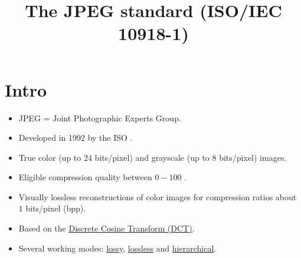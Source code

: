 \title{The JPEG standard (ISO/IEC 10918-1)}
\maketitle
\tableofcontents

\section{Intro}
\begin{itemize}
\item JPEG = Joint Photographic Experts Group.
\item Developed in 1992 by the ISO \cite{CCITT.T81}.
\item True color (up to 24 bits/pixel) and grayscale (up to 8
  bits/pixel) images.
\item Eligible compression quality between $0-100$ \cite{Wallace91}.
\item Visually lossless reconstructions of color images for
  compression ratios about $1$ bits/pixel (bpp).
\item Based on the
  \href{https://en.wikipedia.org/wiki/Discrete_cosine_transform}{Discrete
    Cosine Transform (DCT)}.
\item Several working modes:
  \href{https://en.wikipedia.org/wiki/Lossy_compression}{lossy},
  \href{https://en.wikipedia.org/wiki/Lossless_compression}{lossless}
  and
  \href{https://www.ece.ucdavis.edu/cerl/reliablejpeg/compression/}{hierarchical}.
\end{itemize}

